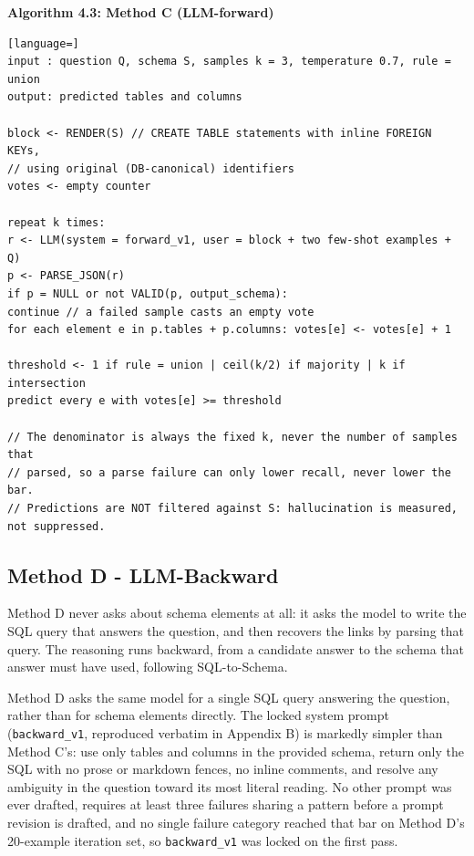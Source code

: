 \textbf{Algorithm 4.3: Method C (LLM-forward)}

\begin{lstlisting}[language=]
input : question Q, schema S, samples k = 3, temperature 0.7, rule = union
output: predicted tables and columns

block <- RENDER(S) // CREATE TABLE statements with inline FOREIGN KEYs,
// using original (DB-canonical) identifiers
votes <- empty counter

repeat k times:
r <- LLM(system = forward_v1, user = block + two few-shot examples + Q)
p <- PARSE_JSON(r)
if p = NULL or not VALID(p, output_schema):
continue // a failed sample casts an empty vote
for each element e in p.tables + p.columns: votes[e] <- votes[e] + 1

threshold <- 1 if rule = union | ceil(k/2) if majority | k if intersection
predict every e with votes[e] >= threshold

// The denominator is always the fixed k, never the number of samples that
// parsed, so a parse failure can only lower recall, never lower the bar.
// Predictions are NOT filtered against S: hallucination is measured, not suppressed.
\end{lstlisting}

\subsection{Method D - LLM-Backward}\label{sec:4-2-4}

Method D never asks about schema elements at all: it asks the model to write the SQL query that answers the question, and then recovers the links by parsing that query. The reasoning runs backward, from a candidate answer to the schema that answer must have used, following \citet{yang2024} SQL-to-Schema.

Method D asks the same model for a single SQL query answering the question, rather than for schema elements directly. The locked system prompt (\texttt{backward\_v1}, reproduced verbatim in Appendix B) is markedly simpler than Method C's: use only tables and columns in the provided schema, return only the SQL with no prose or markdown fences, no inline comments, and resolve any ambiguity in the question toward its most literal reading. No other prompt was ever drafted, requires at least three failures sharing a pattern before a prompt revision is drafted, and no single failure category reached that bar on Method D's 20-example iteration set, so \texttt{backward\_v1} was locked on the first pass.

